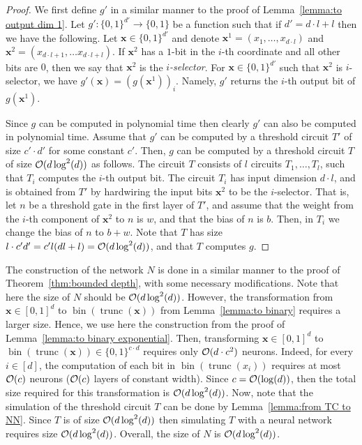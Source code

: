 \documentclass[11pt]{article}
\newcommand{\bx}{\mathbf{x}}
\newcommand{\co}{{\cal O}}
\DeclareMathOperator{\bin}{bin}
\DeclareMathOperator{\trunc}{trunc}
\begin{document}
\begin{proof}
	We first define $g'$ in a similar manner to the proof of Lemma~\ref{lemma:to output dim 1}.
	Let $g':\{0,1\}^{d'} \rightarrow \{0,1\}$ be a function such that if $d' = d \cdot l + l$ then we have the following. Let $\bx \in \{0,1\}^{d'}$ and denote $\bx^1 = (x_1,\ldots,x_{d \cdot l})$ and $\bx^2 = (x_{d \cdot l+1},\ldots x_{d \cdot l+l})$. If $\bx^2$ has a $1$-bit in the $i$-th coordinate and all other bits are $0$, then we say that $\bx^2$ is the {\em $i$-selector}. For $\bx \in \{0,1\}^{d'}$ such that $\bx^2$ is $i$-selector, we have $g'(\bx)=(g(\bx^1))_i$. Namely, $g'$ returns the $i$-th output bit of $g(\bx^1)$.
	
	Since $g$ can be computed in polynomial time then clearly $g'$ can also be computed in polynomial time. 
	Assume that $g'$ can be computed by a threshold circuit $T'$ of size $c' \cdot d'$ for some constant $c'$. Then, $g$ can be computed by a threshold circuit $T$ of size $\co(d\log^2(d))$ as follows. The circuit $T$ consists of $l$ circuits $T_1,\ldots,T_l$, such that $T_i$ computes the $i$-th output bit. The circuit $T_i$ has input dimension $d \cdot l$, and is obtained from $T'$ by hardwiring the input bits $\bx^2$ to be the $i$-selector. That is, let $n$ be a threshold gate in the first layer of $T'$, and assume that the weight from the $i$-th component of $\bx^2$ to $n$ is $w$, and that the bias of $n$ is $b$. Then, in $T_i$ we change the bias of $n$ to $b+w$. Note that $T$ has size $l \cdot c'd' = c'l(d l + l)=\co(d\log^2(d))$, and that $T$ computes $g$.
\end{proof}

The construction of the network $N$ is done in a similar manner to the proof of Theorem~\ref{thm:bounded depth}, with some necessary modifications.
Note that here the size of $N$ should be $\co(d\log^2(d))$. However, the transformation from $\bx \in [0,1]^d$ to $\bin(\trunc(\bx))$ from Lemma~\ref{lemma:to binary} requires a larger size. Hence, we use here the construction from the proof of Lemma~\ref{lemma:to binary exponential}. Then, transforming $\bx \in [0,1]^d$ to $\bin(\trunc(\bx)) \in \{0,1\}^{c \cdot d}$ requires only $\co(d \cdot c^2)$ neurons. Indeed, for every $i \in [d]$, the computation of each bit in $\bin(\trunc(x_i))$ requires at most $\co(c)$ neurons ($\co(c)$ layers of constant width). Since $c=\co(\log(d))$, then the total size required for this transformation is $\co(d \log^2(d))$.
Now, note that the simulation of the threshold circuit $T$ can be done by Lemma~\ref{lemma:from TC to NN}. Since $T$ is of size $\co(d \log^2(d))$ then simulating $T$ with a neural network requires size $\co(d \log^2(d))$.
Overall, the size of $N$ is $\co(d \log^2(d))$.
\end{document}

